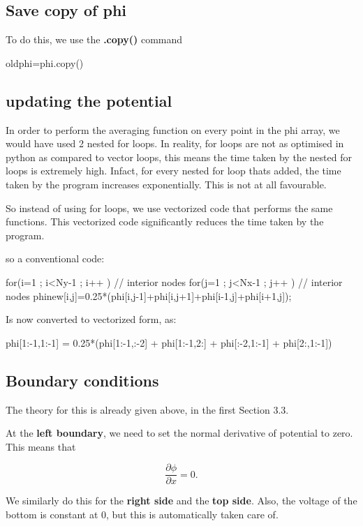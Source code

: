 \documentclass[11pt]{article}
\begin{document}
\subsection{Save copy of phi}
To do this, we use the \textbf{.copy()} command
\begin{python}
oldphi=phi.copy()
\end{python}

\subsection{updating the potential}
In order to perform the averaging function on every point in the phi array, we would have used 2 nested for loops. In reality, for loops are not as optimised in python as compared to vector loops, this means the time taken by the nested for loops is extremely high. Infact, for every nested for loop thats added, the time taken by the program increases exponentially. This is not at all favourable.

So instead of using for loops, we use vectorized code that performs the same functions. This vectorized code significantly reduces the time taken by the program.

so a conventional code:
\begin{python}
for(i=1 ; i<Ny-1 ; i++ ){ // interior nodes
    for(j=1 ; j<Nx-1 ; j++ ){ // interior nodes
        phinew[i,j]=0.25*(phi[i,j-1]+phi[i,j+1]+phi[i-1,j]+phi[i+1,j]);
        }
}
\end{python}

Is now converted to vectorized form, as:

\begin{python}
phi[1:-1,1:-1] = 0.25*(phi[1:-1,:-2] + phi[1:-1,2:] + phi[:-2,1:-1] + phi[2:,1:-1])
\end{python}

\subsection{Boundary conditions}
The theory for this is already given above, in the first Section 3.3.

At the \textbf{left boundary}, we need to set the normal derivative of 
potential to zero. This means that 

\begin{equation}
\frac{\partial \phi}{\partial x} = 0.
\end{equation}

We similarly do this for the \textbf{right side} and the \textbf{top side}.
Also, the voltage of the bottom is constant at 0, but this is automatically 
taken care of.
\end{document}
